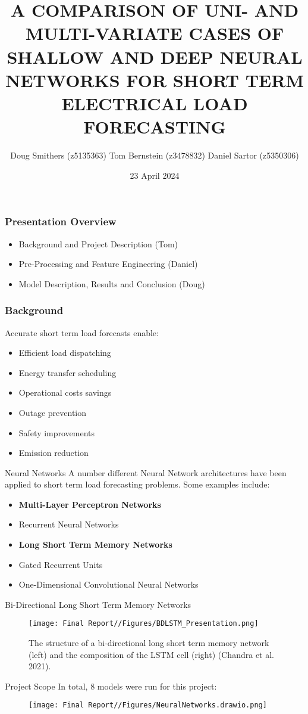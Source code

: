 \documentclass{beamer}
\title{A COMPARISON OF UNI- AND MULTI-VARIATE CASES OF SHALLOW AND DEEP NEURAL NETWORKS FOR SHORT TERM ELECTRICAL LOAD FORECASTING\\[-0.5cm]}
\author{Doug Smithers (z5135363)\newline
Tom Bernstein (z3478832)\newline
Daniel Sartor (z5350306)}
\institute{\texttt{[image: unsw-logo]}}
\date{23 April 2024}
\begin{document}
\frame{\titlepage}

\begin{frame}
\frametitle{Presentation Overview}
\begin{itemize}
    \item Background and Project Description (Tom)
    \item Pre-Processing and Feature Engineering (Daniel)
    \item Model Description, Results and Conclusion (Doug)
\end{itemize}
\end{frame}

\begin{frame}
\frametitle{Background}

Accurate short term load forecasts enable: \newline

\begin{itemize}
    \item Efficient load dispatching
    \item Energy transfer scheduling
    \item Operational costs savings
    \item Outage prevention
    \item Safety improvements
    \item Emission reduction
\end{itemize}

\end{frame}

\begin{frame}{Neural Networks}
A number different Neural Network architectures have been applied to short term load forecasting problems. Some examples include: \newline


\begin{itemize}
    \item \textbf{Multi-Layer Perceptron Networks}
    \item Recurrent Neural Networks
    \item \textbf{Long Short Term Memory Networks}
    \item Gated Recurrent Units
    \item One-Dimensional Convolutional Neural Networks
\end{itemize}


\end{frame}

\begin{frame}{Bi-Directional Long Short Term Memory Networks}
\begin{figure}
    \centering
    \texttt{[image: Final Report//Figures/BDLSTM\_Presentation.png]}
    \caption{The structure of a bi-directional long short term memory network (left) and the composition of the LSTM cell (right) (Chandra et al. 2021).}
    \label{fig:enter-label}
\end{figure}



\end{frame}

\begin{frame}{Project Scope}
In total, 8 models were run for this project:

\begin{figure}
    \centering
    \texttt{[image: Final Report//Figures/NeuralNetworks.drawio.png]} 

\end{figure}
\end{frame}
\end{document}
